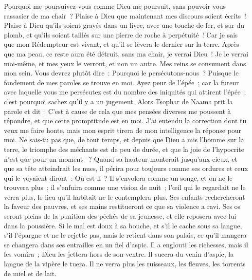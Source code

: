 \begin{multicols}{2}
Pourquoi me poursuivez-vous comme Dieu me poursuit, sans pouvoir vous rassasier de ma chair~?
Plaise à Dieu que maintenant mes discours soient écrits~! Plaise à Dieu qu'ils soient gravés dans un livre,
avec une touche de fer, et sur du plomb, et qu'ils soient taillés sur une pierre de roche à perpétuité~!
Car je sais que mon Rédempteur est vivant, et qu'il se lèvera le dernier sur la terre.
Après que ma peau, ce reste aura été détruit, sans ma chair, je verrai Dieu~!
Je le verrai moi-même, et mes yeux le verront, et non un autre. Mes reins se consument dans mon sein.
Vous devrez plutôt dire~: Pourquoi le persécutons-nous~? Puisque le fondement de mes paroles se trouve en moi.
Ayez peur de l'épée~; car la fureur avec laquelle vous me persécutez est du nombre des iniquités qui attirent l'épée~; c'est pourquoi sachez qu'il y a un jugement.
\VerseOne{}Alors Tsophar de Naama prit la parole et dit~:
C'est à cause de cela que mes pensées diverses me poussent à répondre, et que cette promptitude est en moi.
J'ai entendu la correction dont tu veux me faire honte, mais mon esprit tirera de mon intelligence la réponse pour moi.
Ne sais-tu pas que, de tout temps, et depuis que Dieu a mis l'homme sur la terre,
le triomphe des méchants est de peu de durée, et que la joie de l'hypocrite n'est que pour un moment ~?
Quand sa hauteur monterait jusqu'aux cieux, et que sa tête atteindrait les nues,
il périra pour toujours comme ses ordures et ceux qui le voyaient diront~: Où est-il~?
Il s'envolera comme un songe, et on ne le trouvera plus~; il s'enfuira comme une vision de nuit~;
l'œil qui le regardait ne le verra plus, le lieu qu'il habitait ne le contemplera plus.
Ses enfants rechercheront la faveur des pauvres, et ses mains restitueront ce que sa violence a ravi.
Ses os seront pleins de la punition des péchés de sa jeunesse, et elle reposera avec lui dans la poussière.
Si le mal est doux à sa bouche, et s'il le cache sous sa langue,
s'il l'épargne et ne le rejette pas, mais le retient dans son palais,
ce qu'il mangera se changera dans ses entrailles en un fiel d'aspic.
Il a englouti les richesses, mais il les vomira~; Dieu les jettera hors de son ventre.
Il sucera du venin d'aspic, la langue de la vipère le tuera.
Il ne verra plus les ruisseaux, les fleuves, les torrents de miel et de lait.

\end{multicols}
